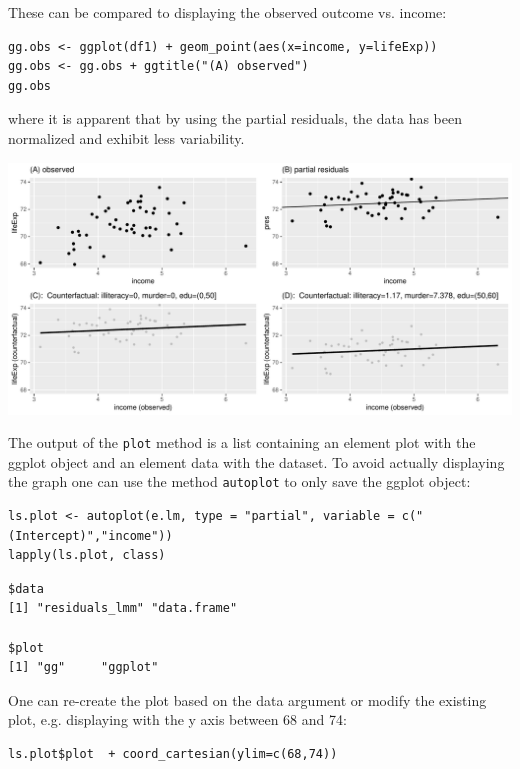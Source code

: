 \documentclass[12pt]{article}
\begin{document}
\clearpage

These can be compared to displaying the observed outcome vs. income:
\lstset{language=r,label= ,caption= ,captionpos=b,numbers=none}
\begin{lstlisting}
gg.obs <- ggplot(df1) + geom_point(aes(x=income, y=lifeExp))
gg.obs <- gg.obs + ggtitle("(A) observed")
gg.obs
\end{lstlisting}

where it is apparent that by using the partial residuals, the data has
been normalized and exhibit less variability.
\begin{center}
\includegraphics[trim={0 0 0 0},width=1\textwidth]{./figures/gg-lmpres-comparisons.pdf}
\end{center}

The output of the \texttt{plot} method is a list containing an element plot
with the ggplot object and an element data with the dataset. To avoid
actually displaying the graph one can use the method \texttt{autoplot} to
only save the ggplot object:
\lstset{language=r,label= ,caption= ,captionpos=b,numbers=none}
\begin{lstlisting}
ls.plot <- autoplot(e.lm, type = "partial", variable = c("(Intercept)","income"))
lapply(ls.plot, class)
\end{lstlisting}

\begin{verbatim}
$data
[1] "residuals_lmm" "data.frame"   

$plot
[1] "gg"     "ggplot"
\end{verbatim}


One can re-create the plot based on the data argument or modify the
existing plot, e.g. displaying with the y axis between 68 and 74:
\lstset{language=r,label= ,caption= ,captionpos=b,numbers=none}
\begin{lstlisting}
ls.plot$plot  + coord_cartesian(ylim=c(68,74))
\end{lstlisting}
\end{document}

